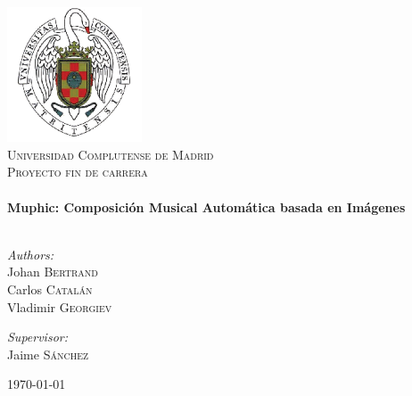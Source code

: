  \maketitle

\begin{titlepage}

\begin{center}


\includegraphics[width=0.3\textwidth]{./graphics/escudo-ucm.png}\\[1cm]    

\textsc{\LARGE Universidad Complutense de Madrid}\\[1.5cm]

\textsc{\Large Proyecto fin de carrera}\\[0.5cm]


\HRule \\[0.4cm]
{ \huge \bfseries Muphic: Composición Musical Automática basada en Imágenes}\\[0.4cm]

\HRule \\[1.5cm]

\begin{minipage}{0.4\textwidth}
\begin{flushleft} \large
\emph{Authors:}\\
Johan \textsc{Bertrand}\\
Carlos \textsc{Catalán}\\
Vladimir \textsc{Georgiev}
\end{flushleft}
\end{minipage}
\begin{minipage}{0.4\textwidth}
\begin{flushright} \large
\emph{Supervisor:} \\
Jaime \textsc{Sánchez}
\end{flushright}
\end{minipage}

\vfill

{\large \today}

\end{center}

\end{titlepage}
